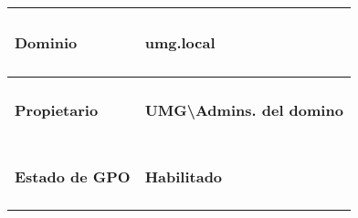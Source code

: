 \documentclass[
]{article}
\begin{document}
\begin{longtable}[]{@{}ll@{}}
\toprule
\begin{minipage}[b]{0.47\columnwidth}\raggedright
\hypertarget{dominio-1}{%
\paragraph{Dominio}\label{dominio-1}}\strut
\end{minipage} & \begin{minipage}[b]{0.47\columnwidth}\raggedright
\hypertarget{umg.local-1}{%
\paragraph{umg.local}\label{umg.local-1}}\strut
\end{minipage}\tabularnewline
\midrule
\endhead
\begin{minipage}[t]{0.47\columnwidth}\raggedright
\hypertarget{propietario-1}{%
\paragraph{Propietario}\label{propietario-1}}\strut
\end{minipage} & \begin{minipage}[t]{0.47\columnwidth}\raggedright
\hypertarget{umgadmins.-del-domino}{%
\paragraph{UMG\textbackslash Admins. del
domino}\label{umgadmins.-del-domino}}\strut
\end{minipage}\tabularnewline
\begin{minipage}[t]{0.47\columnwidth}\raggedright
\hypertarget{estado-de-gpo-1}{%
\paragraph{Estado de GPO}\label{estado-de-gpo-1}}\strut
\end{minipage} & \begin{minipage}[t]{0.47\columnwidth}\raggedright
\hypertarget{habilitado-2}{%
\paragraph{Habilitado}\label{habilitado-2}}\strut
\end{minipage}\tabularnewline
\bottomrule
\end{longtable}
\end{document}
